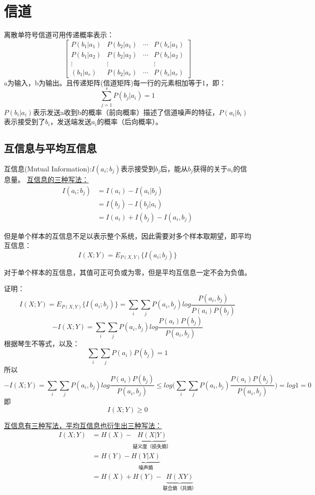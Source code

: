 \documentclass[UTF8]{ctexart} %
\begin{document}
	\section{信道}
		离散单符号信道可用传递概率表示：
			\[ 
			\begin{bmatrix} 
			P(b_1|a_1) &  P(b_2|a_1) & \cdots & P(b_s|a_1)\\
			P(b_1|a_2) &  P(b_2|a_2) & \cdots & P(b_s|a_2)\\
			\vdots & \vdots &   & \vdots\\
			(b_1|a_r) &  P(b_2|a_r) & \cdots & P(b_s|a_r)
			\end{bmatrix} 
			 \]
			 a为输入，b为输出。且传递矩阵(信道矩阵)每一行的元素相加等于1，即：
			 \[\sum_{j=1}^sP(b_j|a_i)=1\]
			 $P(b_i|a_i)$表示发送a收到b的概率（前向概率）描述了信道噪声的特征，$P(a_i|b_i)$表示接受到了$b_i$，发送端发送$a_i$的概率（后向概率）。
		\subsection{互信息与平均互信息}
			互信息(Mutual Information):$I(a_i;b_j)$表示接受到$b_j$后，能从$b_j$获得的关于$a_i$的信息量。
			\uline{互信息的三种写法：}
			\[\begin{aligned}
				I(a_i;b_j) &= I(a_i) - I(a_i | b_j)\\
				& =I(b_j) - I(b_j | a_i)\\
				&  = I(a_i) + I(b_j) -I(a_i,b_j)
			\end{aligned}\]
			
			但是单个样本的互信息不足以表示整个系统，因此需要对多个样本取期望，即平均互信息：
			\[I(X;Y) = E_{P(X,Y)}\{I(a_i;b_j)\}\]
			
			对于单个样本的互信息，其值可正可负或为零，但是平均互信息一定不会为负值。
			
			证明：
			\[I(X;Y) = E_{P(X,Y)}\{I(a_i;b_j)\} = \sum_i\sum_j P(a_i,b_j)log\frac{P(a_i,b_j)}{P(a_i)P(b_j)}\]
			\[-I(X;Y) = \sum_i\sum_j P(a_i,b_j)log\frac{P(a_i)P(b_j)}{P(a_i,b_j)}\]
			根据琴生不等式，以及：
			\[\sum_i\sum_jP(a_i)P(b_j)=1\]
			所以
			 \[-I(X;Y) = \sum_i\sum_j P(a_i,b_j)log\frac{P(a_i)P(b_j)}{P(a_i,b_j)} \leq log\Big(\sum_i\sum_j P(a_i,b_j)\frac{P(a_i)P(b_j)}{P(a_i,b_j)}\Big)=log1=0\]
			 即
			 \[I(X;Y) \geq0\]
			 
			 \uline{互信息有三种写法，平均互信息也衍生出三种写法：}
				\[\begin{aligned}
				I(X;Y) &= H(X) - \underbrace{H(X|Y)}_{\text{疑义度（损失熵）}}\\
				& =H(Y)-\underbrace{H(Y|X)}_{\text{噪声熵}}\\
				&  =H(X)+H(Y)-\underbrace{H(XY)}_{\text{联合熵（共熵）}}
				\end{aligned}\]
\end{document}
